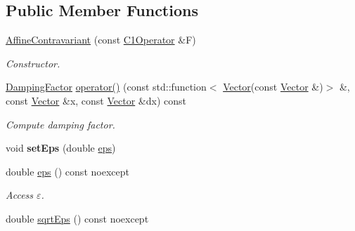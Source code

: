 \subsection*{Public Member Functions}
\begin{DoxyCompactItemize}
\item 
\hyperlink{classSpacy_1_1Newton_1_1Damping_1_1AffineContravariant_afbb2954f22af6d8248ec9c382a5b1ccd}{Affine\+Contravariant} (const \hyperlink{classSpacy_1_1C1Operator}{C1\+Operator} \&F)\hypertarget{classSpacy_1_1Newton_1_1Damping_1_1AffineContravariant_afbb2954f22af6d8248ec9c382a5b1ccd}{}\label{classSpacy_1_1Newton_1_1Damping_1_1AffineContravariant_afbb2954f22af6d8248ec9c382a5b1ccd}

\begin{DoxyCompactList}\small\item\em Constructor. \end{DoxyCompactList}\item 
\hyperlink{classSpacy_1_1DampingFactor}{Damping\+Factor} \hyperlink{classSpacy_1_1Newton_1_1Damping_1_1AffineContravariant_a494dcf0e1c7837b4b6bd18107efcfe0b}{operator()} (const std\+::function$<$ \hyperlink{classSpacy_1_1Vector}{Vector}(const \hyperlink{classSpacy_1_1Vector}{Vector} \&)$>$ \&, const \hyperlink{classSpacy_1_1Vector}{Vector} \&x, const \hyperlink{classSpacy_1_1Vector}{Vector} \&dx) const \hypertarget{classSpacy_1_1Newton_1_1Damping_1_1AffineContravariant_a494dcf0e1c7837b4b6bd18107efcfe0b}{}\label{classSpacy_1_1Newton_1_1Damping_1_1AffineContravariant_a494dcf0e1c7837b4b6bd18107efcfe0b}

\begin{DoxyCompactList}\small\item\em Compute damping factor. \end{DoxyCompactList}\item 
void {\bfseries set\+Eps} (double \hyperlink{classSpacy_1_1Mixin_1_1Eps_a40e2ba8f3abd2b5370ef41238cfaaf8b}{eps})\hypertarget{classSpacy_1_1Mixin_1_1Eps_a1bbfd62541610d5d80f2782ab77158e4}{}\label{classSpacy_1_1Mixin_1_1Eps_a1bbfd62541610d5d80f2782ab77158e4}

\item 
double \hyperlink{classSpacy_1_1Mixin_1_1Eps_a40e2ba8f3abd2b5370ef41238cfaaf8b}{eps} () const noexcept\hypertarget{classSpacy_1_1Mixin_1_1Eps_a40e2ba8f3abd2b5370ef41238cfaaf8b}{}\label{classSpacy_1_1Mixin_1_1Eps_a40e2ba8f3abd2b5370ef41238cfaaf8b}

\begin{DoxyCompactList}\small\item\em Access $\varepsilon$. \end{DoxyCompactList}\item 
double \hyperlink{classSpacy_1_1Mixin_1_1Eps_a29e8c25dc3f1fdede57b8eb06f520fe1}{sqrt\+Eps} () const noexcept\hypertarget{classSpacy_1_1Mixin_1_1Eps_a29e8c25dc3f1fdede57b8eb06f520fe1}{}\label{classSpacy_1_1Mixin_1_1Eps_a29e8c25dc3f1fdede57b8eb06f520fe1}


\end{DoxyCompactItemize}
